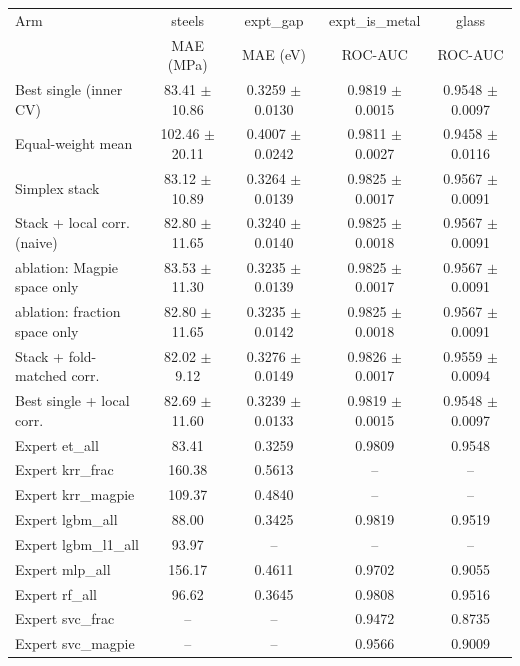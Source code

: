 \begin{tabular}{lcccc}
\toprule
Arm & steels & expt\_gap & expt\_is\_metal & glass \\
 & MAE (MPa) & MAE (eV) & ROC-AUC & ROC-AUC \\
\midrule
Best single (inner CV) & 83.41 $\pm$ 10.86 & 0.3259 $\pm$ 0.0130 & 0.9819 $\pm$ 0.0015 & 0.9548 $\pm$ 0.0097 \\
Equal-weight mean & 102.46 $\pm$ 20.11 & 0.4007 $\pm$ 0.0242 & 0.9811 $\pm$ 0.0027 & 0.9458 $\pm$ 0.0116 \\
Simplex stack & 83.12 $\pm$ 10.89 & 0.3264 $\pm$ 0.0139 & 0.9825 $\pm$ 0.0017 & 0.9567 $\pm$ 0.0091 \\
Stack + local corr. (naive) & 82.80 $\pm$ 11.65 & 0.3240 $\pm$ 0.0140 & 0.9825 $\pm$ 0.0018 & 0.9567 $\pm$ 0.0091 \\
\quad ablation: Magpie space only & 83.53 $\pm$ 11.30 & 0.3235 $\pm$ 0.0139 & 0.9825 $\pm$ 0.0017 & 0.9567 $\pm$ 0.0091 \\
\quad ablation: fraction space only & 82.80 $\pm$ 11.65 & 0.3235 $\pm$ 0.0142 & 0.9825 $\pm$ 0.0018 & 0.9567 $\pm$ 0.0091 \\
Stack + fold-matched corr. & 82.02 $\pm$ 9.12 & 0.3276 $\pm$ 0.0149 & 0.9826 $\pm$ 0.0017 & 0.9559 $\pm$ 0.0094 \\
Best single + local corr. & 82.69 $\pm$ 11.60 & 0.3239 $\pm$ 0.0133 & 0.9819 $\pm$ 0.0015 & 0.9548 $\pm$ 0.0097 \\
\midrule
Expert et\_all & 83.41 & 0.3259 & 0.9809 & 0.9548 \\
Expert krr\_frac & 160.38 & 0.5613 & -- & -- \\
Expert krr\_magpie & 109.37 & 0.4840 & -- & -- \\
Expert lgbm\_all & 88.00 & 0.3425 & 0.9819 & 0.9519 \\
Expert lgbm\_l1\_all & 93.97 & -- & -- & -- \\
Expert mlp\_all & 156.17 & 0.4611 & 0.9702 & 0.9055 \\
Expert rf\_all & 96.62 & 0.3645 & 0.9808 & 0.9516 \\
Expert svc\_frac & -- & -- & 0.9472 & 0.8735 \\
Expert svc\_magpie & -- & -- & 0.9566 & 0.9009 \\
\bottomrule
\end{tabular}
